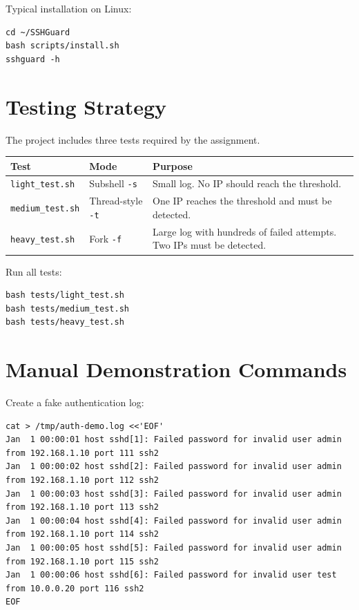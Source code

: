 \documentclass[12pt,a4paper]{article}
\begin{document}
Typical installation on Linux:

\begin{lstlisting}[style=bashstyle]
cd ~/SSHGuard
bash scripts/install.sh
sshguard -h
\end{lstlisting}

\section{Testing Strategy}

The project includes three tests required by the assignment.

\begin{longtable}{|p{4cm}|p{4cm}|p{6cm}|}
\hline
\textbf{Test} & \textbf{Mode} & \textbf{Purpose} \\
\hline
\texttt{light\_test.sh} & Subshell \texttt{-s} & Small log. No IP should reach the threshold. \\
\hline
\texttt{medium\_test.sh} & Thread-style \texttt{-t} & One IP reaches the threshold and must be detected. \\
\hline
\texttt{heavy\_test.sh} & Fork \texttt{-f} & Large log with hundreds of failed attempts. Two IPs must be detected. \\
\hline
\end{longtable}

Run all tests:

\begin{lstlisting}[style=bashstyle]
bash tests/light_test.sh
bash tests/medium_test.sh
bash tests/heavy_test.sh
\end{lstlisting}

\section{Manual Demonstration Commands}

Create a fake authentication log:

\begin{lstlisting}[style=bashstyle]
cat > /tmp/auth-demo.log <<'EOF'
Jan  1 00:00:01 host sshd[1]: Failed password for invalid user admin from 192.168.1.10 port 111 ssh2
Jan  1 00:00:02 host sshd[2]: Failed password for invalid user admin from 192.168.1.10 port 112 ssh2
Jan  1 00:00:03 host sshd[3]: Failed password for invalid user admin from 192.168.1.10 port 113 ssh2
Jan  1 00:00:04 host sshd[4]: Failed password for invalid user admin from 192.168.1.10 port 114 ssh2
Jan  1 00:00:05 host sshd[5]: Failed password for invalid user admin from 192.168.1.10 port 115 ssh2
Jan  1 00:00:06 host sshd[6]: Failed password for invalid user test from 10.0.0.20 port 116 ssh2
EOF
\end{lstlisting}
\end{document}
